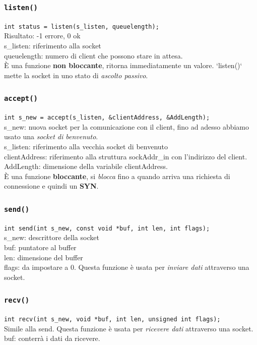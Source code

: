 \subsubsection*{\texttt{listen()}}
\texttt{int status = listen(s\_listen, queuelength);} \\
Risultato: -1 errore, 0 ok \\
s\_listen: riferimento alla socket \\
queuelength: numero di client che possono stare in attesa. \\
È una funzione \textbf{non bloccante}, ritorna immediatamente un valore. `listen()` mette la socket in uno stato di \textit{ascolto passivo}.

\subsubsection*{\texttt{accept()}}
\texttt{int s\_new = accept(s\_listen, \&clientAddress, \&AddLength);} \\
s\_new: nuova socket per la comunicazione con il client, fino ad adesso abbiamo usato una \textit{socket di benvenuto}. \\
s\_listen: riferimento alla vecchia socket di benvenuto \\
clientAddress: riferimento alla struttura sockAddr\_in con l'indirizzo del client. \\
AddLength: dimensione della variabile clientAddress. \\
È una funzione \textbf{bloccante}, si \textit{blocca} fino a quando arriva una richiesta di connessione e quindi un \textbf{SYN}.

\subsubsection*{\texttt{send()}}
\texttt{int send(int s\_new, const void *buf, int len, int flags);} \\ 
s\_new: descrittore della socket \\
buf: puntatore al buffer \\
len: dimensione del buffer \\
flags: da impostare a 0. Questa funzione è usata per \textit{inviare dati} attraverso una socket.

\subsubsection*{\texttt{recv()}}
\texttt{int recv(int s\_new, void *buf, int len, unsigned int flags);} \\
Simile alla send. Questa funzione è usata per \textit{ricevere dati} attraverso una socket. \\
buf: conterrà i dati da ricevere.

